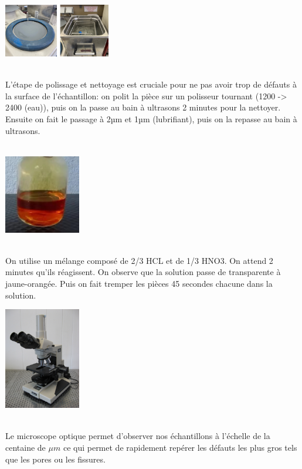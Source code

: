 \centerline{\includegraphics[width=0.35\textwidth]{images/WechatIMG1126.jpeg}}

\\
L'étape de polissage et nettoyage est cruciale pour ne pas avoir trop de défauts à la surface de l'échantillon:
on polit la pièce sur un polisseur tournant (1200 -> 2400 (eau)), puis on la passe au bain à ultrasons 2 minutes pour la nettoyer.
Ensuite on fait le passage à 2µm et 1µm (lubrifiant),
puis on la repasse au bain à ultrasons.
\\
\\
\centerline{\includegraphics[width=0.25\textwidth]{images/WechatIMG1128.jpeg}}
\\
On utilise un mélange composé de 2/3 HCL et de 1/3 HNO3.
On attend 2 minutes qu'ils réagissent.
On observe que la solution passe de transparente à jaune-orangée.
Puis on fait tremper les pièces 45 secondes chacune dans la solution.
\\

\centerline{\includegraphics[width=0.25\textwidth]{images/optique.jpg}}
\\
Le microscope optique permet d'observer nos échantillons à l'échelle de la centaine de $\mu m$ ce qui permet de rapidement repérer les défauts les plus gros tels que les pores ou les fissures.
\\

